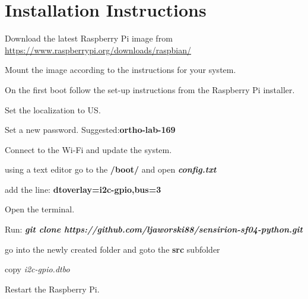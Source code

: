 \documentclass[12pt]{article}
\begin{document}
\tableofcontents

\newpage

\section{Installation Instructions}

\begin{inparaenum}
    \item Download the latest Raspberry Pi image from \url{https://www.raspberrypi.org/downloads/raspbian/}
    \item Mount the image according to the instructions for your system.
    \item On the first boot follow the set-up instructions from the Raspberry Pi installer.
    \begin{inparaenum}
        \item Set the localization to US.
        \item Set a new password. Suggested:\textbf{ortho-lab-169}
        \item Connect to the Wi-Fi and update the system.
    \end{inparaenum}
    \item using a text editor go to the \textbf{/boot/} and open \textit{\textbf{config.txt}}
    \item add the line: \textbf{dtoverlay=i2c-gpio,bus=3}
    \item Open the terminal.
    \item Run: \textbf{\textit{git clone https://github.com/ljaworski88/sensirion-sf04-python.git}}
    \item go into the newly created folder and goto the \textbf{src} subfolder
    \item copy \textit{i2c-gpio.dtbo}
    \item Restart the Raspberry Pi.
\end{inparaenum}
\end{document}

